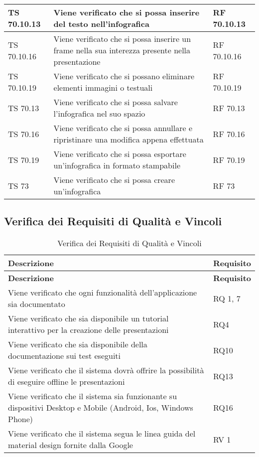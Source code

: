 {{\begin{longtable} [c]{| p{3cm} | p{6cm} |p{3cm}|}
			\hline
			TS 70.10.13 & Viene verificato che si possa inserire del testo nell'infografica & RF 70.10.13\\
			\hline
			TS 70.10.16 & Viene verificato che si possa inserire un frame nella sua interezza presente nella presentazione & RF 70.10.16\\
			\hline
			TS 70.10.19 & Viene verificato che si possano eliminare elementi immagini o testuali & RF 70.10.19\\
			\hline
			TS 70.13 & Viene verificato che si possa salvare l'infografica nel suo spazio & RF 70.13\\
			\hline
			TS 70.16 & Viene verificato che si possa annullare e ripristinare una modifica appena effettuata & RF 70.16\\
			\hline
			TS 70.19 & Viene verificato che si possa esportare un'infografica in formato stampabile & RF 70.19\\
			\hline
			TS 73 & Viene verificato che si possa creare un'infografica & RF 73\\
			\hline
\end{longtable}
}
\newpage
\subsection{Verifica dei Requisiti di Qualità e Vincoli}{
		\renewcommand*{\arraystretch}{1.4}
		\begin{longtable} [c]{| p{7cm} |p{4cm}|}
			\caption{Verifica dei Requisiti di Qualità e Vincoli \label{tab:verReqQualVinc}}\\
			 \hline
			 \textbf{Descrizione} & \textbf{Requisito} \\
			 \hline
			 \endfirsthead
			 \hline
			 \textbf{Descrizione} & \textbf{Requisito} \\
			 \hline
			\endhead
			 \hline
			 \endfoot
			 \hline
			 \endlastfoot
			Viene verificato che ogni funzionalità dell'applicazione sia documentato & RQ 1, 7\\
			\hline
			Viene verificato che sia disponibile un tutorial interattivo per la creazione delle presentazioni & RQ4\\
			\hline
			Viene verificato che sia disponibile della documentazione sui test eseguiti & RQ10\\
			\hline
			Viene verificato che il sistema dovrà offrire la possibilità di eseguire offline le presentazioni & RQ13\\
			\hline
			Viene verificato che il sistema sia funzionante su dispositivi Desktop e Mobile (Android, Ios, Windows Phone) & RQ16\\
			\hline
			Viene verificato che il sistema segua le linea guida del material design fornite dalla Google & RV 1\\
\end{longtable}
}
}
